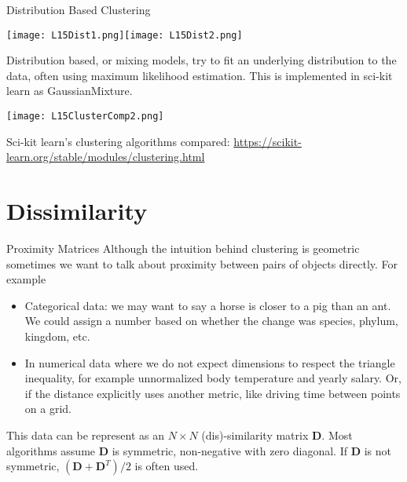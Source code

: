\documentclass[10pt, table, dvipsnames,xcdraw, handout]{beamer}
\newcommand{\bfD}{\ensuremath{\mathbf{D}}}
\begin{document}
\begin{frame}[fragile]{Distribution Based Clustering}
  \begin{minipage}[t][0.5\textheight][t]{\textwidth}
	\centering \texttt{[image: L15Dist1.png]}\hspace{1em}\texttt{[image: L15Dist2.png]} 
  \end{minipage}
  \vfill
\begin{minipage}[t][0.5\textheight][t]{\textwidth}
Distribution based, or mixing models, try to fit an underlying distribution to the data, often using maximum likelihood estimation. This is implemented in sci-kit learn as GaussianMixture.\pause
\end{minipage}
\end{frame}



\begin{frame}[fragile]
  \begin{minipage}[t][0.8\textheight][t]{\textwidth}
	\centering \texttt{[image: L15ClusterComp2.png]}
  \end{minipage}
  \vfill
\begin{minipage}[t][0.2\textheight][t]{\textwidth}
Sci-kit learn's clustering algorithms compared: \url{https://scikit-learn.org/stable/modules/clustering.html}
\end{minipage}
\end{frame}


\section{Dissimilarity}


\begin{frame}[fragile]{Proximity Matrices}
Although the intuition behind clustering is geometric sometimes we want to talk about proximity between pairs of objects directly. \pause For example

\begin{itemize}
\item[] Categorical data: we may want to say a horse is closer to a pig than an ant. We could assign a number based on whether the change was species, phylum, kingdom, etc. \pause
\item[] In numerical data where we do not expect dimensions to respect the triangle inequality, for example unnormalized body temperature and yearly salary. \pause Or, if the distance explicitly uses another metric, like driving time between points on a grid. \pause
\end{itemize}
This data can be represent as an $N\times N$  (dis)-similarity matrix $\bfD$. Most algorithms assume $\bfD$ is symmetric, non-negative with zero diagonal. \pause If $\bfD$ is not symmetric, $(\bfD+\bfD^T)/2$ is often used. 

\end{frame}
\end{document}
